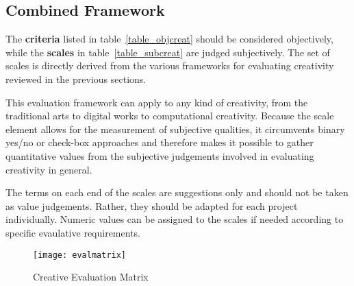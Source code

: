 %
%
%


\subsection{Combined Framework}
\label{s:framework}

The \textbf{criteria} listed in table~\ref{table_objcreat} should be considered objectively, while the \textbf{scales} in table~\ref{table_subcreat} are judged subjectively. The set of scales is directly derived from the various frameworks for evaluating creativity reviewed in the previous sections.

This evaluation framework can apply to any kind of creativity, from the traditional arts to digital works to computational creativity. Because the scale element allows for the measurement of subjective qualities, it circumvents binary yes/no or check-box approaches and therefore makes it possible to gather quantitative values from the subjective judgements involved in evaluating creativity in general.

The terms on each end of the scales are suggestions only and should not be taken as value judgements. Rather, they should be adapted for each project individually. Numeric values can be assigned to the scales if needed according to specific evaulative requirements.


\begin{figure}[htb]
  \centering
  \texttt{[image: evalmatrix]}
  \caption[Evaluation Matrix]{Creative Evaluation Matrix}
\label{evalmatrix}
\end{figure}


